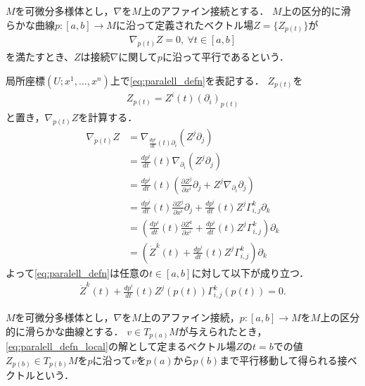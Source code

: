 \documentclass{MochiMochi}
\begin{document}
\begin{defn}
$M$を可微分多様体とし，$\nabla$を$M$上のアファイン接続とする．
$M$上の区分的に滑らかな曲線$p:[a,b]\to M$に沿って定義されたベクトル場$Z = \{ Z_{p(t)} \}$が
\begin{align}\label{eq:paralell_defn}
    \nabla_{\dot{p}(t)}Z = 0, \ \forall t\in [a,b]
\end{align}
を満たすとき、$Z$は接続$\nabla$に関して$p$に沿って平行であるという．
\end{defn}

局所座標$(U;x^1,\ldots, x^n)$上で\eqref{eq:paralell_defn}を表記する．
$Z_{p(t)}$を
\begin{align}
    Z_{p(t)} = Z^i (t) (\partial_i)_{p(t)}
\end{align}
と置き，$\nabla_{\dot{p}(t)}Z$を計算する．
\begin{align}
    \nabla_{\dot{p}(t)}Z &= \nabla_{\frac{d p^i}{dt}(t)\partial_i} (Z^j \partial_j)\\
&=\frac{d p^i}{dt}(t)\nabla_{\partial_i}(Z^j \partial_j)\\
&=\frac{d p^i}{dt}(t) \left(\frac{\partial Z^j}{\partial x^i} \partial_j + Z^j \nabla_{\partial_i} \partial_j\right)\\
&=\frac{d p^i}{dt}(t)\frac{\partial Z^j}{\partial x^i} \partial_j + \frac{d p^i}{dt}(t) Z^j \Gamma_{i,j}^k \partial_k\\
&=\left(\frac{d p^i}{dt}(t)\frac{\partial Z^k}{\partial x^i} + \frac{d p^i}{dt}(t) Z^j \Gamma_{i,j}^k\right) \partial_k\\
&=\left( \dot{Z}^k(t) + \frac{d p^i}{dt}(t) Z^j \Gamma_{i,j}^k\right) \partial_k
\end{align}
よって\eqref{eq:paralell_defn}は任意の$t\in [a,b]$に対して以下が成り立つ．
\begin{align}\label{eq:paralell_defn_local}
    \dot{Z}^k(t) + \frac{d p^i}{dt}(t) Z^j(p(t))\Gamma_{i,j}^k(p(t)) = 0.
\end{align}


\begin{defn}
$M$を可微分多様体とし，$\nabla$を$M$上のアファイン接続，$p:[a,b]\to M$を$M$上の区分的に滑らかな曲線とする．
$v\in T_{p(a)} M$が与えられたとき，\eqref{eq:paralell_defn_local}の解として定まるベクトル場$Z$の$t=b$での値$Z_{p(b)}\in T_{p(b)} M$を$p$に沿って$v$を$p(a)$から$p(b)$まで平行移動して得られる接ベクトルという．
\end{defn}
\end{document}
